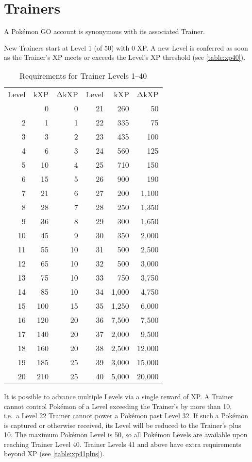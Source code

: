 \chapter{Trainers}
A Pokémon GO account is synonymous with its associated Trainer.

New Trainers start at Level 1 (of 50) with 0 XP\@.
A new Level is conferred as soon as the Trainer's XP meets or exceeds
  the Level's XP threshold (see \autoref{table:xp40}).
\begin{table}[ht]
\begin{center}
\begin{tabular}{r r r|r r r}
  Level & kXP & ΔkXP & Level & kXP & ΔkXP \\
\Midrule
1 & 0 & 0 & 21 & 260 & 50 \\
2 & 1 & 1 & 22 & 335 & 75 \\
3 & 3 & 2 & 23 & 435 & 100 \\
4 & 6 & 3 & 24 & 560 & 125 \\
5 & 10 & 4 & 25 & 710 & 150 \\
6 & 15 & 5 & 26 & 900 & 190 \\
7 & 21 & 6 & 27 & 200 & 1,100 \\
8 & 28 & 7 & 28 & 250 & 1,350 \\
9 & 36 & 8 & 29 & 300 & 1,650 \\
10 & 45 & 9 & 30 & 350 & 2,000 \\
11 & 55 & 10 & 31 & 500 & 2,500 \\
12 & 65 & 10 & 32 & 500 & 3,000 \\
13 & 75 & 10 & 33 & 750 & 3,750 \\
14 & 85 & 10 & 34 & 1,000 & 4,750 \\
15 & 100 & 15 & 35 & 1,250 & 6,000 \\
16 & 120 & 20 & 36 & 7,500 & 7,500 \\
17 & 140 & 20 & 37 & 2,000 & 9,500 \\
18 & 160 & 20 & 38 & 2,500 & 12,000 \\
19 & 185 & 25 & 39 & 3,000 & 15,000 \\
20 & 210 & 25 & 40 & 5,000 & 20,000 \\
\end{tabular}
\caption{Requirements for Trainer Levels 1--40}
\label{table:xp40}
\end{center}
\end{table}
It is possible to advance multiple Levels via a single reward of XP\@.
A Trainer cannot control Pokémon of a Level exceeding the Trainer's by more than 10,
  i.e.\ a Level 22 Trainer cannot power a Pokémon past Level 32.
If such a Pokémon is captured or otherwise received, its Level will be
  reduced to the Trainer's plus 10.
The maximum Pokémon Level is 50, so all Pokémon Levels are available upon
  reaching Trainer Level 40.
Trainer Levels 41 and above have extra requirements beyond XP (see \autoref{table:xp41plus}).

